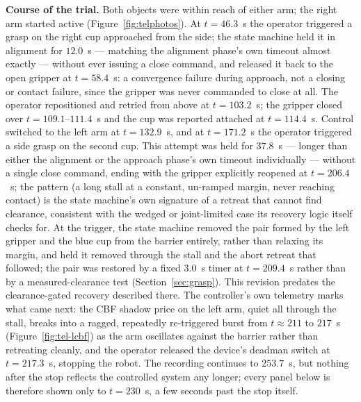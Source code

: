\textbf{Course of the trial.} Both objects were within reach of either arm; the right arm started active (Figure~\ref{fig:telphotos}). At $t=46.3$~s the operator triggered a grasp on the right cup approached from the side; the state machine held it in alignment for $12.0$~s --- matching the alignment phase's own timeout almost exactly --- without ever issuing a close command, and released it back to the open gripper at $t=58.4$~s: a convergence failure during approach, not a closing or contact failure, since the gripper was never commanded to close at all. The operator repositioned and retried from above at $t=103.2$~s; the gripper closed over $t=109.1$--$111.4$~s and the cup was reported attached at $t=114.4$~s. Control switched to the left arm at $t=132.9$~s, and at $t=171.2$~s the operator triggered a side grasp on the second cup. This attempt was held for $37.8$~s --- longer than either the alignment or the approach phase's own timeout individually --- without a single close command, ending with the gripper explicitly reopened at $t=206.4$~s; the pattern (a long stall at a constant, un-ramped margin, never reaching contact) is the state machine's own signature of a retreat that cannot find clearance, consistent with the wedged or joint-limited case its recovery logic itself checks for. At the trigger, the state machine removed the pair formed by the left gripper and the blue cup from the barrier entirely, rather than relaxing its margin, and held it removed through the stall and the abort retreat that followed; the pair was restored by a fixed $3.0$~s timer at $t=209.4$~s rather than by a measured-clearance test (Section~\ref{sec:grasp}). This revision predates the clearance-gated recovery described there. The controller's own telemetry marks what came next: the CBF shadow price on the left arm, quiet all through the stall, breaks into a ragged, repeatedly re-triggered burst from $t\approx211$ to $217$~s (Figure~\ref{fig:tel-lcbf}) as the arm oscillates against the barrier rather than retreating cleanly, and the operator released the device's deadman switch at $t=217.3$~s, stopping the robot. The recording continues to $253.7$~s, but nothing after the stop reflects the controlled system any longer; every panel below is therefore shown only to $t=230$~s, a few seconds past the stop itself.

